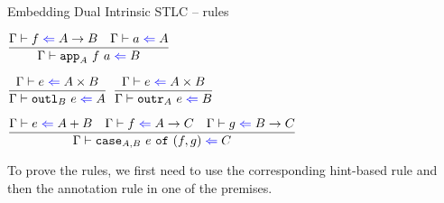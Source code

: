 \documentclass{beamer}
\begin{document}
\begin{frame}{Embedding Dual Intrinsic STLC -- rules}

\begin{center}
  $\infrule{\check{f}{\Fun{A}{B}} \quad \check{a}{A}}{\check{\iapp{A}{f}{a}}{B}}$

  \vspace{2em}

  $\infrule{\check{e}{\Prod{A}{B}}}{\check{\ioutl{B}{e}}{A}}$ \enspace
  $\infrule{\check{e}{\Prod{A}{B}}}{\check{\ioutr{A}{e}}{B}}$

  \vspace{2em}

  $\infrule{\check{e}{\Sum{A}{B}} \quad \check{f}{\Fun{A}{C}} \quad \check{g}{\Fun{B}{C}}}{\check{\icase{A}{B}{e}{f}{g}}{C}}$
\end{center}

\vspace{2em}

To prove the rules, we first need to use the corresponding hint-based rule and then the annotation rule in one of the premises.

\end{frame}
\end{document}

